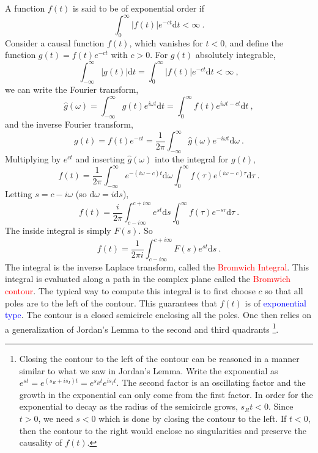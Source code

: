 \documentclass[12pt,a4paper]{article}
\newcommand{\dif}{\mathrm{d}}
\begin{document}
\cite{Herman:1742872} A function $f(t)$ is said to be of exponential order if $$\int_0^\infty |f(t)| e^{-ct} \dif t < \infty ~.$$ Consider a causal function $f(t)$, which vanishes for $t < 0$, and define the function $g(t) = f(t) e^{-ct}$ with $c > 0$. For $g(t)$ absolutely integrable,
\begin{equation}
\int_{-\infty}^\infty |g(t)| \dif t = \int_0^\infty |f(t)| e^{-ct} \dif t < \infty ~,
\end{equation}
we can write the Fourier transform,
\begin{equation}
\hat{g}(\omega) = \int_{-\infty}^\infty g(t) e^{i \omega t}  \dif t =  \int_0^\infty f(t) e^{i \omega t-ct} \dif t ~,
\end{equation}
and the inverse Fourier transform,
\begin{equation}
g(t) = f(t) e^{-ct} = \dfrac{1}{2\pi} \int_{-\infty}^\infty \hat{g}(\omega) e^{-i \omega t}  \dif \omega ~.
\end{equation}
Multiplying by $e^{ct}$ and inserting $\hat{g}(\omega)$ into the integral for $g(t)$,
\begin{equation}
f(t) = \dfrac{1}{2\pi} \int_{-\infty}^\infty e^{-(i \omega -c)t}  \dif \omega  \int_0^\infty f(\tau) e^{(i \omega -c)\tau} \dif \tau ~.
\end{equation}
Letting $s = c-i \omega$ (so $\dif \omega = i \dif s$),
\begin{equation}
f(t) = \dfrac{i}{2\pi} \int_{c-i\infty}^{c+i\infty} e^{s t}  \dif s  \int_0^\infty f(\tau) e^{-s \tau} \dif \tau ~.
\end{equation}
The inside integral is simply $F(s)$. So
\begin{equation}
f(t) = \dfrac{1}{2\pi i} \int_{c-i\infty}^{c+i\infty} F(s) e^{s t}  \dif s ~.
\end{equation}
The integral is the inverse Laplace transform, called the \textcolor{red}{Bromwich Integral}. This integral is evaluated along a path in the complex plane called the \textcolor{red}{Bromwich contour}. The typical way to compute this integral is to first choose $c$ so that all poles are to the left of the contour. This guarantees that $f(t)$ is of \textcolor{blue}{exponential type}. The contour is a closed semicircle enclosing all the poles. One then relies on a generalization of Jordan's Lemma to the second and third quadrants \footnote{Closing the contour to the left of the contour can be reasoned in a manner similar to what we saw in Jordan's Lemma. Write the exponential as $e^{st} = e^{(s_R+is_I)t} = e^{s_R t} e^{is_I t}$. The second factor is an oscillating factor and the growth in the exponential can only come from the first factor. In order for the exponential to decay as the radius of the semicircle grows, $s_R t < 0$. Since $t > 0$, we need $s < 0$ which is done by closing the contour to the left. If $t < 0$, then the contour to the right would enclose no singularities and preserve the causality of $f(t)$.}.
\end{document}
